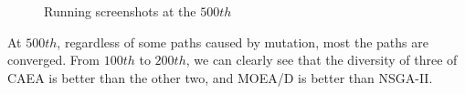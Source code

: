 \documentclass[a4paper, 11pt]{article}
\begin{document}
\begin{figure}[htb]
    \begin{center}
    \end{center}
    \caption{Running screenshots at the $500th$}
\end{figure}
\begin{flushleft}
At $500th$, regardless of some paths caused by mutation, most the paths are converged.
From $100th$ to $200th$, we can clearly see that the diversity of three of CAEA is better than the other two,
and MOEA/D is better than NSGA-II.
\end{flushleft}
\end{document}
